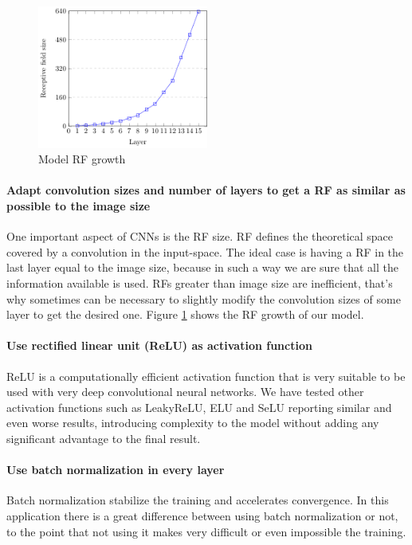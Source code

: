 \documentclass[review]{elsarticle}
\theoremstyle{definition} %
\theoremstyle{remark}
\begin{document}
\begin{figure}[ht!]
	\centering
	\includegraphics[width=0.50\textwidth]{./figures/receptive_field_640.pdf}
	\caption{Model RF growth}
	\label{fig:rf_graph}
\end{figure}

\paragraph{Adapt convolution sizes and number of layers to get a RF as similar as possible to the image size} One important aspect of CNNs is the RF size. RF defines the theoretical space covered by a convolution in the input-space. The ideal case is having a RF in the last layer equal to the image size, because in such a way we are sure that all the information available is used. RFs greater than image size are inefficient, that's why sometimes can be necessary to slightly modify the convolution sizes of some layer to get the desired one. Figure \ref{fig:rf_graph} shows the RF growth of our model.

\paragraph{Use rectified linear unit (ReLU) as activation function} ReLU is a computationally efficient activation function that is very suitable to be used with very deep convolutional neural networks\cite{Dahl2013}. We have tested other activation functions such as LeakyReLU, ELU and SeLU reporting similar and even worse results, introducing complexity to the model without adding any significant advantage to the final result.

\paragraph{Use batch normalization in every layer} Batch normalization \cite{batch-norm} stabilize the training and accelerates convergence. In this application there is a great difference between using batch normalization or not, to the point that not using it makes very difficult or even impossible the training.
\end{document}
